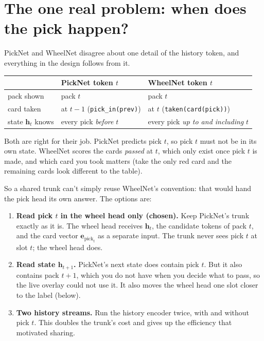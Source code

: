 \documentclass[11pt,letterpaper]{article}
\newcommand{\code}[1]{\texttt{\small #1}}
\begin{document}
\section{The one real problem: when does the pick happen?}\label{sec:timing}

PickNet and WheelNet disagree about one detail of the history token, and everything in the design follows
from it.

\begin{center}\small
\begin{tabular}{lll}
\toprule
& PickNet token $t$ & WheelNet token $t$ \\
\midrule
pack shown & pack $t$ & pack $t$ \\
card taken & at $t-1$ (\code{pick\_in(prev)}) & at $t$ (\code{taken(card(pick))}) \\
state $\mathbf h_t$ knows & every pick \emph{before} $t$ & every pick \emph{up to and including} $t$ \\
\bottomrule
\end{tabular}
\end{center}

Both are right for their job. PickNet predicts pick $t$, so pick $t$ must not be in its own state. WheelNet
scores the cards \emph{passed} at $t$, which only exist once pick $t$ is made, and which card you took matters
(take the only red card and the remaining cards look different to the table).

So a shared trunk can't simply reuse WheelNet's convention: that would hand the pick head its own answer.
The options are:

\begin{enumerate}
\item \textbf{Read pick $t$ in the wheel head only (chosen).} Keep PickNet's trunk exactly as it is. The
wheel head receives $\mathbf h_t$, the candidate tokens of pack $t$, and the card vector $\mathbf e_{\text{pick}_t}$
as a separate input. The trunk never sees pick $t$ at slot $t$; the wheel head does.
\item \textbf{Read state $\mathbf h_{t+1}$.} PickNet's next state does contain pick $t$. But it also
contains pack $t+1$, which you do not have when you decide what to pass, so the live overlay could not use
it. It also moves the wheel head one slot closer to the label (below).
\item \textbf{Two history streams.} Run the history encoder twice, with and without pick $t$. This doubles
the trunk's cost and gives up the efficiency that motivated sharing.
\end{enumerate}
\end{document}

